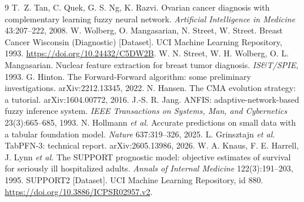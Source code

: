 \documentclass[11pt,a4paper]{article}
\begin{document}
\begingroup\small
\begin{thebibliography}{9}
 T.~Z. Tan, C. Quek, G. S. Ng, K. Razvi. Ovarian cancer diagnosis with complementary learning fuzzy neural network. \emph{Artificial Intelligence in Medicine} 43:207--222, 2008.
 W. Wolberg, O. Mangasarian, N. Street, W. Street. Breast Cancer Wisconsin (Diagnostic) [Dataset]. UCI Machine Learning Repository, 1993. \url{https://doi.org/10.24432/C5DW2B}.
 W. N. Street, W. H. Wolberg, O. L. Mangasarian. Nuclear feature extraction for breast tumor diagnosis. \emph{IS\&T/SPIE}, 1993.
 G. Hinton. The Forward-Forward algorithm: some preliminary investigations. arXiv:2212.13345, 2022.
 N. Hansen. The CMA evolution strategy: a tutorial. arXiv:1604.00772, 2016.
 J.-S. R. Jang. ANFIS: adaptive-network-based fuzzy inference system. \emph{IEEE Transactions on Systems, Man, and Cybernetics} 23(3):665--685, 1993.
 N. Hollmann \emph{et al.} Accurate predictions on small data with a tabular foundation model. \emph{Nature} 637:319--326, 2025.
 L. Grinsztajn \emph{et al.} TabPFN-3: technical report. arXiv:2605.13986, 2026.
 W. A. Knaus, F. E. Harrell, J. Lynn \emph{et al.} The SUPPORT prognostic model: objective estimates of survival for seriously ill hospitalized adults. \emph{Annals of Internal Medicine} 122(3):191--203, 1995.
 SUPPORT2 [Dataset]. UCI Machine Learning Repository, id 880. \url{https://doi.org/10.3886/ICPSR02957.v2}.
\end{thebibliography}
\endgroup
\end{document}
